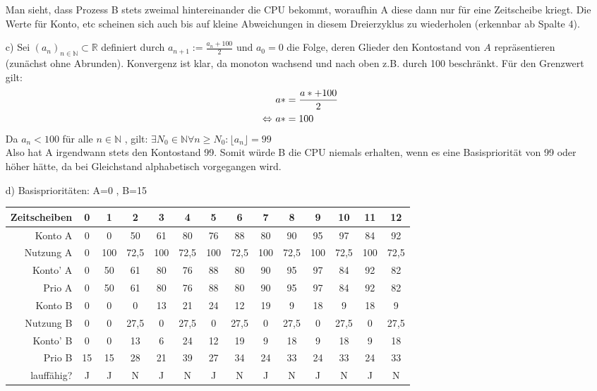 \documentclass{ti2}
\begin{document}
\begin{itemize}
\begin{table}[h]
\begin{tabular}{r|ccccccccccccc}
\end{tabular}

\end{table}

Man sieht, dass Prozess B stets zweimal hintereinander die CPU bekommt, woraufhin A diese dann nur für eine Zeitscheibe kriegt. Die Werte für Konto, etc scheinen sich auch bis auf kleine Abweichungen in diesem Dreierzyklus zu wiederholen (erkennbar ab Spalte 4).
\item[c)] Sei $(a_n)_{n\in\mathbb{N}}\subset \mathbb{R}$ definiert durch $a_{n+1}:=\frac{a_n+100}{2}$ und $a_0=0$ die Folge, deren Glieder den Kontostand von $A$ repräsentieren (zunächst ohne Abrunden). Konvergenz ist klar, da monoton wachsend und nach oben z.B. durch 100 beschränkt. Für den Grenzwert gilt:
\begin{align}
&a*=\frac{a*+100}{2} \notag\\
\Leftrightarrow~&a*=100\notag
\end{align}
Da $a_n<100$ für alle $n\in\mathbb{N}$ , gilt: $\exists N_0\in\mathbb{N}\forall n\geq N_0: \lfloor a_n\rfloor = 99 $
\\
Also hat A irgendwann stets den Kontostand 99. Somit würde B die CPU niemals erhalten, wenn es eine Basispriorität von 99 oder höher hätte, da bei Gleichstand alphabetisch vorgegangen wird.
\item[d)]
Basisprioritäten: A=0 , B=15
\begin{table}[h]
\begin{tabular}{r|ccccccccccccc}
Zeitscheiben & 0 & 1 & 2 & 3 & 4 & 5 & 6 & 7 & 8 & 9 & 10 & 11 & 12\\
\hline
Konto A      &0&0&50&61&80&76&88&80&90&95&97&84&92\\
Nutzung A    &0&100&72,5&100&72,5&100&72,5&100&72,5&100&72,5&100&72,5\\
Konto' A     &0&50&61&80&76&88&80&90&95&97&84&92&82\\
Prio A       &0&50&61&80&76&88&80&90&95&97&84&92&82\\
\hline
Konto B 	 &0&0&0&13&21&24&12&19&9&18&9&18&9\\
Nutzung B    &0&0&27,5&0&27,5&0&27,5&0&27,5&0&27,5&0&27,5\\
Konto' B     &0&0&13&6&24&12&19&9&18&9&18&9&18  \\
Prio B       &15&15&28&21&39&27&34&24&33&24&33&24&33   \\
lauffähig?	 &J&J&N&J&N&J&N&J&N&J&N&J&N

\end{tabular}
\end{table}

\end{itemize}
\end{document}
